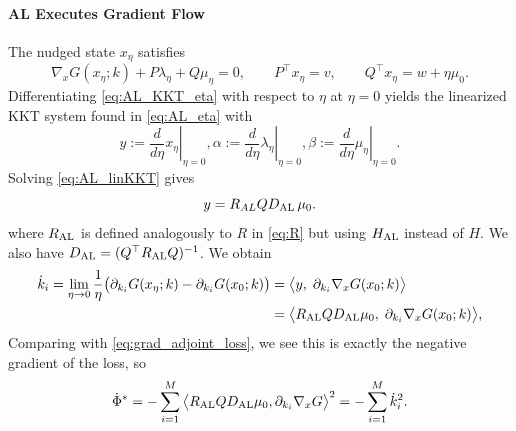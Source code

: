 \documentclass{siamart}
\begin{document}
\paragraph{AL Executes Gradient Flow}
The nudged state $x_\eta$ satisfies
\begin{equation}
\label{eq:AL_KKT_eta}
\nabla_x G(x_\eta;k) + P\lambda_\eta + Q\mu_\eta = 0,
\qquad
P^\top x_\eta = v,
\qquad
Q^\top x_\eta = w + \eta\mu_0 .
\end{equation}
Differentiating \eqref{eq:AL_KKT_eta} with respect to $\eta$ at $\eta=0$ yields the linearized
KKT system found in \eqref{eq:AL_eta} with
\begin{equation}
\label{eq:AL_linKKT}
y := \left.\frac{d}{d\eta}x_\eta\right|_{\eta=0},\alpha := \left.\frac{d}{d\eta}\lambda_\eta\right|_{\eta=0},\beta := \left.\frac{d}{d\eta}\mu_\eta\right|_{\eta=0}.
\end{equation}
Solving \eqref{eq:AL_linKKT} gives
\begin{equation}
\label{eq:AL_y}
y = R_{AL}Q D_{\rm AL}\,\mu_0.
\end{equation}
where $R_{\rm AL}$ is defined analogously to $R$ in \eqref{eq:R} but using $H_{\rm AL}$ instead of $H$. We also have $D_{\rm AL} = (Q^\top R_{\rm AL} Q)^{-1}$. We obtain
\begin{equation}
\begin{aligned}
\label{eq:AL_limit}
\dot{k}_i=\lim_{\eta\to0}
\frac{1}{\eta}
\big(
\partial_{k_i}G(x_\eta;k)
-
\partial_{k_i}G(x_0;k)
\big)
&=\big\langle y,\;\partial_{k_i}\nabla_x G(x_0;k)\big\rangle
\\&=
\big\langle R_{\rm AL}Q D_{\rm AL}\mu_0,\;\partial_{k_i}\nabla_x G(x_0;k)\big\rangle ,
\end{aligned}
\end{equation}
 Comparing with \eqref{eq:grad_adjoint_loss}, we see this is exactly the negative gradient of the loss, so 
 \begin{equation}
    \dot{\Phi}^* = - \sum_{i=1}^M\big\langle R_{\rm AL} Q D_{\rm AL}\mu_0,\partial_{k_i}\nabla_x G\big\rangle^2=- \sum_{i=1}^M\dot{k}_i^2.
\end{equation}
\end{document}
